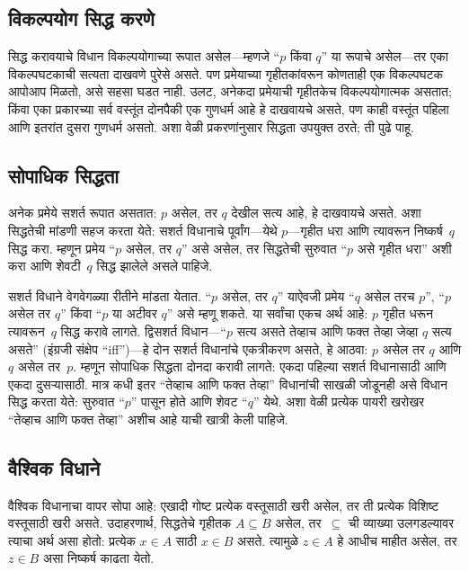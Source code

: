 \subsection{विकल्पयोग सिद्ध करणे}

सिद्ध करावयाचे विधान विकल्पयोगाच्या रूपात असेल---म्हणजे “$p$ किंवा $q$” या रूपाचे असेल---तर एका विकल्पघटकाची सत्यता दाखवणे पुरेसे असते. पण प्रमेयाच्या गृहीतकांवरून कोणताही एक विकल्पघटक आपोआप मिळतो, असे सहसा घडत नाही. उलट, अनेकदा प्रमेयाची गृहीतकेच विकल्पयोगात्मक असतात; किंवा एका प्रकारच्या सर्व वस्तूंत दोनपैकी एक गुणधर्म आहे हे दाखवायचे असते, पण काही वस्तूंत पहिला आणि इतरांत दुसरा गुणधर्म असतो. अशा वेळी प्रकरणांनुसार सिद्धता उपयुक्त ठरते; ती पुढे पाहू.

\subsection{सोपाधिक सिद्धता}

अनेक प्रमेये सशर्त रूपात असतात: $p$ असेल, तर $q$ देखील सत्य आहे, हे दाखवायचे असते. अशा सिद्धतेची मांडणी सहज करता येते: सशर्त विधानाचे पूर्वांग---येथे $p$---गृहीत धरा आणि त्यावरून निष्कर्ष~$q$ सिद्ध करा. म्हणून प्रमेय “$p$ असेल, तर $q$” असे असेल, तर सिद्धतेची सुरुवात “$p$ असे गृहीत धरा” अशी करा आणि शेवटी~$q$ सिद्ध झालेले असले पाहिजे.

सशर्त विधाने वेगवेगळ्या रीतीने मांडता येतात. “$p$ असेल, तर $q$” याऐवजी प्रमेय “$q$ असेल तरच $p$”, “$p$ असेल तर $q$” किंवा “$p$ या अटीवर $q$” असे म्हणू शकते. या सर्वांचा एकच अर्थ आहे: $p$ गृहीत धरून त्यावरून~$q$ सिद्ध करावे लागते. द्विसशर्त विधान---“$p$ सत्य असते तेव्हाच आणि फक्त तेव्हा जेव्हा $q$ सत्य असते” (इंग्रजी संक्षेप “iff”)---हे दोन सशर्त विधानांचे एकत्रीकरण असते, हे आठवा: $p$ असेल तर $q$ आणि $q$ असेल तर~$p$. म्हणून सोपाधिक सिद्धता दोनदा करावी लागते: एकदा पहिल्या सशर्त विधानासाठी आणि एकदा दुसऱ्यासाठी. मात्र कधी इतर “तेव्हाच आणि फक्त तेव्हा” विधानांची साखळी जोडूनही असे विधान सिद्ध करता येते: सुरुवात “$p$” पासून होते आणि शेवट “$q$” येथे. अशा वेळी प्रत्येक पायरी खरोखर “तेव्हाच आणि फक्त तेव्हा” अशीच आहे याची खात्री केली पाहिजे.

\subsection{वैश्विक विधाने}

वैश्विक विधानाचा वापर सोपा आहे: एखादी गोष्ट प्रत्येक वस्तूसाठी खरी असेल, तर ती प्रत्येक विशिष्ट वस्तूसाठी खरी असते. उदाहरणार्थ, सिद्धतेचे गृहीतक $A \subseteq B$ असेल, तर~$\subseteq$ ची व्याख्या उलगडल्यावर त्याचा अर्थ असा होतो: प्रत्येक $x \in A$ साठी $x \in B$ असते. त्यामुळे $z \in A$ हे आधीच माहीत असेल, तर $z \in B$ असा निष्कर्ष काढता येतो.

